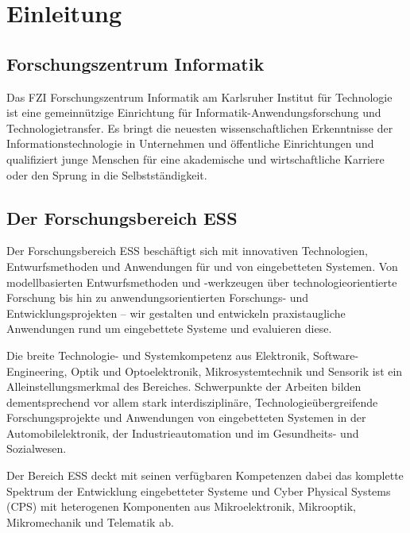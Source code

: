 
\section{Einleitung}
\subsection{Forschungszentrum Informatik}
\label{sec:FZI}
\glqq Das FZI Forschungszentrum Informatik am Karlsruher Institut für Technologie ist eine gemeinnützige Einrichtung für Informatik-Anwendungsforschung und Technologietransfer. Es bringt die neuesten wissenschaftlichen Erkenntnisse der Informationstechnologie in Unternehmen und öffentliche Einrichtungen und qualifiziert junge Menschen für eine akademische und wirtschaftliche Karriere oder den Sprung in die Selbstständigkeit.\grqq{} \cite{FZI_info}

\subsection{Der Forschungsbereich ESS}
\label{sec:ESS}
\glqq Der Forschungsbereich \acf{ESS} beschäftigt sich mit innovativen Technologien, Entwurfsmethoden und Anwendungen für und von eingebetteten Systemen. Von modellbasierten Entwurfsmethoden und -werkzeugen über technologieorientierte Forschung bis hin zu anwendungsorientierten Forschungs- und Entwicklungsprojekten – wir gestalten und entwickeln praxistaugliche Anwendungen rund um eingebettete Systeme und evaluieren diese.

Die breite Technologie- und Systemkompetenz aus Elektronik, Software-Engineering, Optik und Optoelektronik, Mikrosystemtechnik und Sensorik ist ein Alleinstellungsmerkmal des Bereiches. Schwerpunkte der Arbeiten bilden dementsprechend vor allem stark interdisziplinäre, Technologieübergreifende Forschungsprojekte und Anwendungen von eingebetteten Systemen in der Automobilelektronik, der Industrieautomation und im Gesundheits- und Sozialwesen.

Der Bereich ESS deckt mit seinen verfügbaren Kompetenzen dabei das komplette Spektrum der Entwicklung eingebetteter Systeme und Cyber Physical Systems (CPS) mit heterogenen Komponenten aus Mikroelektronik, Mikrooptik, Mikromechanik und Telematik ab.\grqq{}  \cite{ESS}





